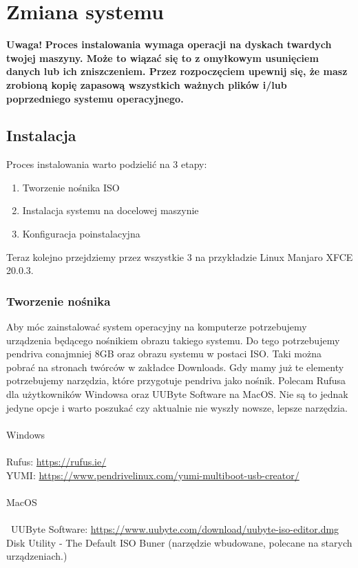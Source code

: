 \documentclass[10pt,a4paper]{report}
\begin{document}
\chapter{Zmiana systemu}

\textbf{Uwaga!} \textbf{Proces instalowania wymaga operacji na dyskach twardych twojej maszyny. Może to wiązać się to z omyłkowym usunięciem danych lub ich zniszczeniem. Przez rozpoczęciem upewnij się, że masz zrobioną kopię zapasową wszystkich ważnych plików i/lub poprzedniego systemu operacyjnego.}

	\section{Instalacja}
	
Proces instalowania warto podzielić na 3 etapy:
\begin{enumerate}
\item Tworzenie nośnika ISO
\item Instalacja systemu na docelowej maszynie
\item Konfiguracja poinstalacyjna\\
\end{enumerate}	
Teraz kolejno przejdziemy przez wszystkie 3 na przykładzie Linux Manjaro XFCE 20.0.3.

		\subsection{Tworzenie nośnika}

Aby móc zainstalować system operacyjny na komputerze potrzebujemy urządzenia będącego nośnikiem obrazu takiego systemu. Do tego potrzebujemy pendriva conajmniej 8GB oraz obrazu systemu w postaci ISO. Taki można pobrać na stronach twórców w zakładce Downloads. Gdy mamy już te elementy potrzebujemy narzędzia, które przygotuje pendriva jako nośnik. Polecam Rufusa dla użytkowników Windowsa oraz UUByte Software na MacOS. Nie są to jednak jedyne opcje i warto poszukać czy aktualnie nie wyszły nowsze, lepsze narzędzia.\\\\Windows\\\\Rufus: \url{https://rufus.ie/}\\ YUMI: \url{https://www.pendrivelinux.com/yumi-multiboot-usb-creator/}\\\\MacOS\\\\\ UUByte Software: \url{https://www.uubyte.com/download/uubyte-iso-editor.dmg}\\Disk Utility - The Default ISO Buner (narzędzie wbudowane, polecane na starych urządzeniach.)
	
\end{document}
